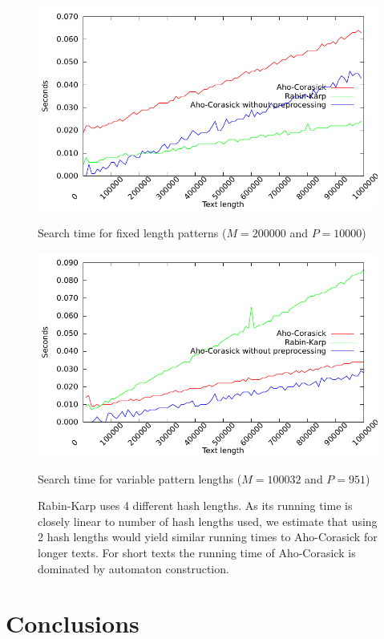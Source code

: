 \documentclass[final]{beamer}
\begin{document}
\begin{poster}
\begin{figure}
\label{fig:text_len_fixed}
\centering
 \includegraphics[width=23cm]{text_len_fixed.pdf}
\caption{
Search time for fixed length patterns ($M = 200000$ and $P = 10000$)
}
\caption*{ }
\end{figure}

\begin{figure}
\label{fig:text_len_var}
\centering
 \includegraphics[width=23cm]{text_len.pdf}
\caption{
Search time for variable pattern lengths ($M = 100032$ and $ P = 951 $)
}
\caption*{
Rabin-Karp uses 4 different hash lengths. As its running time is closely linear to
number of hash lengths used, we estimate that using 2 hash lengths would yield
similar running times to Aho-Corasick for longer texts.
\newline
\newline
For short texts the running time of Aho-Corasick is dominated by automaton construction.
}
\end{figure}

\section{Conclusions}


\end{poster}
\end{document}
